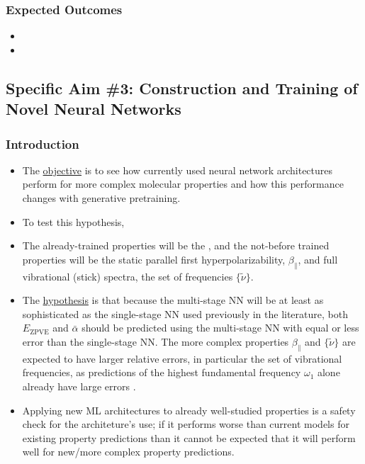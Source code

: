 \documentclass[12pt]{article}
\begin{document}

\subsubsection{Expected Outcomes}
\label{sec:orge011eeb}

\begin{itemize}
\item {}
\item {}
\end{itemize}

\subsection{Specific Aim \#3: Construction and Training of Novel Neural Networks}
\label{sec:org9451cda}

\subsubsection{Introduction}
\label{sec:org8b07208}

\begin{itemize}
\item The \uline{objective} is to see how currently used neural network architectures perform for more complex molecular properties and how this performance changes with generative pretraining.

\item To test this hypothesis,

\item The already-trained properties will be the , and the not-before trained properties will be the static parallel first hyperpolarizability, \(\beta_{\parallel}\), and full vibrational (stick) spectra, the set of frequencies \(\{\tilde{\nu}\}\).

\item The \uline{hypothesis} is that because the multi-stage NN will be at least as sophisticated as the single-stage NN used previously in the literature, both \(E_{\text{ZPVE}}\) and \(\bar{\alpha}\) should be predicted using the multi-stage NN with equal or less error than the single-stage NN. The more complex properties \(\beta_{\parallel}\) and \(\{\tilde{\nu}\}\) are expected to have larger relative errors, in particular the set of vibrational frequencies, as predictions of the highest fundamental frequency \(\omega_1\) alone already have large errors \cite{2017arXiv170205532F}.

\item Applying new ML architectures to already well-studied properties is a safety check for the architeture's use; if it performs worse than current models for existing property predictions than it cannot be expected that it will perform well for new/more complex property predictions.
\end{itemize}
\end{document}
